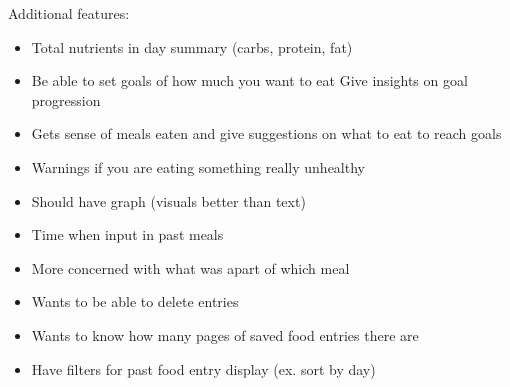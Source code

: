 \documentclass[12pt, titlepage]{article}
\begin{document}
	Additional features:
	\begin{itemize}
		\item Total nutrients in day summary (carbs, protein, fat)
		\item Be able to set goals of how much you want to eat
		\subitem Give insights on goal progression
		\item Gets sense of meals eaten and give suggestions on what to eat to reach goals
		\item Warnings if you are eating something really unhealthy
		\item Should have graph (visuals better than text)
		\item Time when input in past meals
			\item More concerned with what was apart of which meal
		\item Wants to be able to delete entries
		\item Wants to know how many pages of saved food entries there are
		\item Have filters for past food entry display (ex. sort by day)
	\end{itemize}
\end{document}
